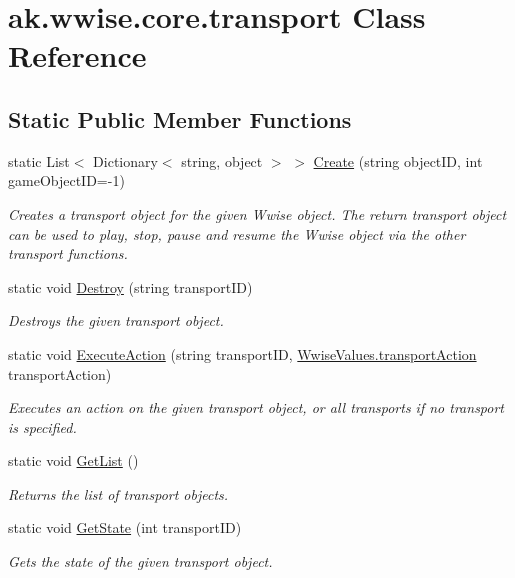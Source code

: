 \hypertarget{classak_1_1wwise_1_1core_1_1transport}{}\section{ak.\+wwise.\+core.\+transport Class Reference}
\label{classak_1_1wwise_1_1core_1_1transport}
\subsection*{Static Public Member Functions}
\begin{DoxyCompactItemize}
\item 
static List$<$ Dictionary$<$ string, object $>$ $>$ \mbox{\hyperlink{classak_1_1wwise_1_1core_1_1transport_a50ec44c5163f7dccdc5da5e9a679d6d8}{Create}} (string object\+ID, int game\+Object\+ID=-\/1)
\begin{DoxyCompactList}\small\item\em Creates a transport object for the given Wwise object. The return transport object can be used to play, stop, pause and resume the Wwise object via the other transport functions. \end{DoxyCompactList}\item 
static void \mbox{\hyperlink{classak_1_1wwise_1_1core_1_1transport_ad2da39e96d6afd24fe3fa62e638aeefe}{Destroy}} (string transport\+ID)
\begin{DoxyCompactList}\small\item\em Destroys the given transport object. \end{DoxyCompactList}\item 
static void \mbox{\hyperlink{classak_1_1wwise_1_1core_1_1transport_a350a07341027f555a36456b64c5181b7}{Execute\+Action}} (string transport\+ID, \mbox{\hyperlink{class_waapi_c_s_1_1_custom_values_1_1_wwise_values_abe08eb4038ce656dcf1f451b78a35983}{Wwise\+Values.\+transport\+Action}} transport\+Action)
\begin{DoxyCompactList}\small\item\em Executes an action on the given transport object, or all transports if no transport is specified. \end{DoxyCompactList}\item 
static void \mbox{\hyperlink{classak_1_1wwise_1_1core_1_1transport_a1fe7ea7c0ee307919f744e6b3a573deb}{Get\+List}} ()
\begin{DoxyCompactList}\small\item\em Returns the list of transport objects. \end{DoxyCompactList}\item 
static void \mbox{\hyperlink{classak_1_1wwise_1_1core_1_1transport_a884e837f29fa1ac8f212dd981d1a6df6}{Get\+State}} (int transport\+ID)
\begin{DoxyCompactList}\small\item\em Gets the state of the given transport object. \end{DoxyCompactList}\end{DoxyCompactItemize}


